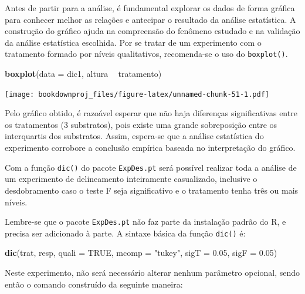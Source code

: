 \documentclass[
]{article}
\newenvironment{Shaded}{\begin{snugshade}}{\end{snugshade}}
\newcommand{\DataTypeTok}[1]{\textcolor[rgb]{0.13,0.29,0.53}{#1}}
\newcommand{\FloatTok}[1]{\textcolor[rgb]{0.00,0.00,0.81}{#1}}
\newcommand{\KeywordTok}[1]{\textcolor[rgb]{0.13,0.29,0.53}{\textbf{#1}}}
\newcommand{\NormalTok}[1]{#1}
\newcommand{\OperatorTok}[1]{\textcolor[rgb]{0.81,0.36,0.00}{\textbf{#1}}}
\newcommand{\OtherTok}[1]{\textcolor[rgb]{0.56,0.35,0.01}{#1}}
\newcommand{\StringTok}[1]{\textcolor[rgb]{0.31,0.60,0.02}{#1}}
\begin{document}
Antes de partir para a análise, é fundamental explorar os dados de forma gráfica para conhecer melhor as relações e antecipar o resultado da análise estatística. A construção do gráfico ajuda na compreensão do fenômeno estudado e na validação da análise estatística escolhida. Por se tratar de um experimento com o tratamento formado por níveis qualitativos, recomenda-se o uso do \texttt{boxplot()}.

\begin{Shaded}
\begin{Highlighting}[]
\KeywordTok{boxplot}\NormalTok{(}\DataTypeTok{data =}\NormalTok{ dic1, altura }\OperatorTok{~}\StringTok{ }\NormalTok{tratamento)}
\end{Highlighting}
\end{Shaded}

\texttt{[image: bookdownproj\_files/figure-latex/unnamed-chunk-51-1.pdf]}

Pelo gráfico obtido, é razoável esperar que não haja diferenças significativas entre os tratamentos (3 substratos), pois existe uma grande sobreposição entre os interquartis dos substratos. Assim, espera-se que a análise estatística do experimento corrobore a conclusão empírica baseada no interpretação do gráfico.

Com a função \texttt{dic()} do pacote \texttt{ExpDes.pt} será possível realizar toda a análise de um experimento de delineamento inteiramente casualizado, inclusive o desdobramento caso o teste F seja significativo e o tratamento tenha três ou mais níveis.

Lembre-se que o pacote \texttt{ExpDes.pt} não faz parte da instalação padrão do R, e precisa ser adicionado à parte. A sintaxe básica da função \texttt{dic()} é:

\begin{Shaded}
\begin{Highlighting}[]
\KeywordTok{dic}\NormalTok{(trat, resp, }\DataTypeTok{quali =} \OtherTok{TRUE}\NormalTok{, }\DataTypeTok{mcomp =} \StringTok{"tukey"}\NormalTok{, }\DataTypeTok{sigT =} \FloatTok{0.05}\NormalTok{, }\DataTypeTok{sigF =} \FloatTok{0.05}\NormalTok{)}
\end{Highlighting}
\end{Shaded}

Neste experimento, não será necessário alterar nenhum parâmetro opcional, sendo então o comando construído da seguinte maneira:

\begin{Shaded}
\end{Shaded}
\end{document}
